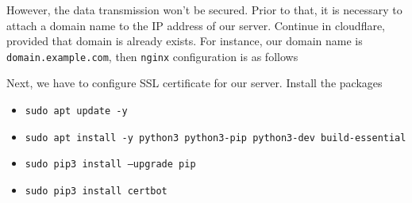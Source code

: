 However, the data transmission won't be secured.
Prior to that, it is necessary to attach a domain name to the IP address of our server.
Continue in cloudflare, provided that domain is already exists.
For instance, our domain name is \texttt{domain.example.com}, then \texttt{nginx}
configuration is as follows
\begin{center}
\end{center}
Next, we have to configure SSL certificate for our server.
Install the packages
\begin{itemize}
    \item \texttt{sudo apt update -y}
    \item \texttt{sudo apt install -y python3 python3-pip python3-dev build-essential}
    \item \texttt{sudo pip3 install --upgrade pip}
    \item \texttt{sudo pip3 install certbot}
\end{itemize}
